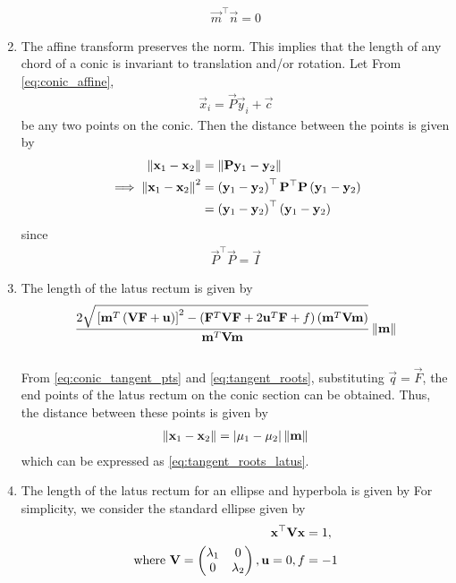 \documentclass[journal,12pt,twocolumn]{IEEEtran}
\renewcommand\thesection{\arabic{section}}
\renewcommand\thesubsection{\thesection.\arabic{subsection}}
\begin{document}
\begin{enumerate}[label=\thesubsection.\arabic*.,ref=\thesubsection.\theenumi]
\begin{align}
	\vec{m}^{\top} \vec{n} = 0
\end{align}
\item The affine transform preserves the norm.  This implies that the length of any chord of a conic
	is invariant to translation and/or rotation.
	\solution Let 
From \eqref{eq:conic_affine}, 
\begin{align}
\vec{x}_i = \vec{P}\vec{y}_i+\vec{c} 
\label{eq:conic_affine_pts}
\end{align}
be any two points on the conic.  Then the distance between the points is given by 
\begin{align}
	\left\lVert\mathbf{x}_1-\mathbf{x}_2 \right\rVert &= \left\lVert\mathbf{P}	\mathbf{y}_1 -\mathbf{y}_2 \right\rVert
	\\
	\implies \left\lVert\mathbf{x}_1-\mathbf{x}_2 \right\rVert^2 &= 		\left(\mathbf{y}_1 -\mathbf{y}_2 \right)^{\top}\mathbf{P}^{\top}\mathbf{P}\left(\mathbf{y}_1 -\mathbf{y}_2 \right)
	\\
	&= 		\left(\mathbf{y}_1 -\mathbf{y}_2 \right)^{\top}\left(\mathbf{y}_1 -\mathbf{y}_2 \right)
\end{align}
since 
\begin{align}
	\vec{P}^{\top}\vec{P} = \vec{I}
\end{align}
\item The length of the latus rectum is given by 
{\tiny
\begin{multline}
 \frac{2\sqrt{
{}\left[
\mathbf{m}^T\left(\mathbf{V}\mathbf{F}+\mathbf{u}\right)
\right]^2
-
\left(
\mathbf{F}^T\mathbf{V}\mathbf{F} + 2\mathbf{u}^T\mathbf{F} +f
\right)
\left(\mathbf{m}^T\mathbf{V}\mathbf{m}\right)
}
}
{
\mathbf{m}^T\mathbf{V}\mathbf{m}
}\left\lVert\mathbf{m}\right\rVert
\label{eq:tangent_roots_latus}
\end{multline}
}
	\\
	\solution From 
\eqref{eq:conic_tangent_pts}
and
\eqref{eq:tangent_roots}, substituting $\vec{q} = \vec{F}$, the end points of the latus rectum on the conic
section can be obtained.  Thus, the distance between these points is given by 
\begin{align}
	\left\lVert\mathbf{x}_1-\mathbf{x}_2\right\rVert =  \left\vert\mu_1-\mu_2\right\vert \left\lVert\mathbf{m}\right\rVert
\label{eq:conic_tangent_pts_dist}
\end{align}
which can be expressed as
\eqref{eq:tangent_roots_latus}.
\item The length of the latus rectum for an ellipse and hyperbola is given by
	\solution For simplicity, we consider the standard ellipse given by 
\begin{align}
	\vec{x}^{\top}\vec{V}\vec{x} &= 1,
	\\
	\text{where }
	\vec{V} = \myvec{\lambda_1 & 0 \\ 0 & \lambda_2}, \vec{u} = 0, f &= -1

\end{align}
\end{enumerate}
\end{document}
